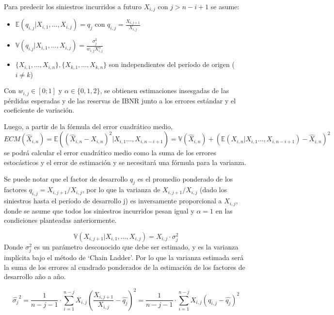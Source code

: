 \documentclass[
  12pt,
]{article}
\begin{document}
Para predecir los siniestros incurridos a futuro \(X_{i,j}\) con
\(j>n-i+1\) se asume:

\begin{itemize}

\item $\mathbb{E}(q_{i,j}|X_{i,1},\ldots,X_{i,j}) = q_j$ con $q_{i,j} = \frac{X_{i,j+1}}{X_{i,j}}$

\item $\mathbb{V}(q_{i.j}|X_{i,1},\ldots,X_{i,j}) = \frac{\sigma^2_j}{w_{i,j}X_{i,j}^\alpha} $

\item $\{ X_{i,1},\ldots,X_{i,n} \}, \{X_{k,1},\ldots,X_{k,n}\}$ son independientes del período de origen ($i \neq k$)

\end{itemize}

Con \(w_{i,j} \in [0;1]\) y \(\alpha \in \{0,1,2\}\), se obtienen
estimaciones insesgadas de las pérdidas esperadas y de las reservas de
IBNR junto a los errores estándar y el coeficiente de variación.

Luego, a partir de la fórmula del error cuadrático medio,
\(ECM(\hat{X}_{i,n})=\mathbb{E}((\hat{X}_{i,n}-X_{i,n})^2|X_{i,1}\ldots,X_{i,n-i+1})=\mathbb{V}(\hat{X}_{i,n}) + (\mathbb{E}(X_{i,n}|X_{i,1}\ldots,X_{i,n-i+1})-\hat{X}_{i,n})^2\)
se podrá calcular el error cuadrático medio como la suma de los errores
estocásticos y el error de estimación y se necesitará una fórmula para
la varianza.

Se puede notar que el factor de desarrollo \(q_j\) es el promedio
ponderado de los factores \(q_{i,j}=X_{i,j+1}/X_{i,j}\), por lo que la
varianza de \(X_{i,j+1}/X_{i,j}\) (dado los siniestros hasta el período
de desarrollo j) es inversamente proporcional a \(X_{i,j}\), donde se
asume que todos los siniestros incurridos pesan igual y \(\alpha=1\) en
las condiciones planteadas anteriormente.

\[
\mathbb{V}(X_{i,j+1}|X_{i,1},\ldots,X_{i,j}) = X_{i,j}\cdot \sigma_j^2
\] Donde \(\sigma_j^2\) es un parámetro desconocido que debe ser
estimado, y es la varianza implícita bajo el método de `Chain Ladder'.
Por lo que la varianza estimada será la suma de los errores al cuadrado
ponderados de la estimación de los factores de desarrollo año a año.

\[
\hat{\sigma_j}^2 = \frac{1}{n-j-1}\cdot \sum_{i=1}^{n-j} X_{i,j}\left( \frac{X_{i,j+1}}{X_{i,j}} - \hat{q_j} \right)^2=\frac{1}{n-j-1}\cdot \sum_{i=1}^{n-j} X_{i,j}\left( q_{i,j} - \hat{q_j} \right)^2
\]
\end{document}
